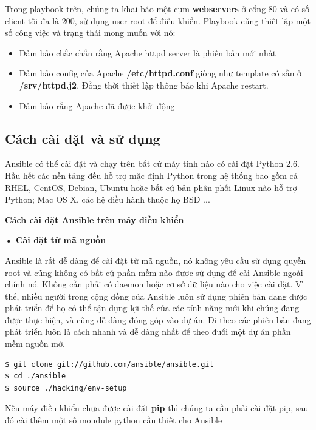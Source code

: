 Trong playbook trên, chúng ta khai báo một cụm \textbf{webservers} ở cổng 80 và có số client tối đa là 200, sử dụng user root để điều khiển. Playbook cũng thiết lập một số công việc và trạng thái mong muốn với nó:

\begin{itemize}
\item Đảm bảo chắc chắn rằng Apache httpd server là phiên bản mới nhất
\item Đảm bảo config của Apache \textbf{/etc/httpd.conf} giống như template có sẵn ở \textbf{/srv/httpd.j2}. Đồng thời thiết lập thông báo khi Apache restart.
\item Đảm bảo rằng Apache đã được khởi động
\end{itemize}

\subsection{Cách cài đặt và sử dụng}

Ansible có thể cài đặt và chạy trên bất cứ máy tính nào có cài đặt Python 2.6. Hầu hết các nền tảng đều hỗ trợ mặc định Python trong hệ thống bao gồm cả RHEL, CentOS, Debian, Ubuntu hoặc bất cứ bản phân phối Linux nào hỗ trợ Python; Mac OS X, các hệ điều hành thuộc họ BSD ...

\textbf{\large Cách cài đặt Ansible trên máy điều khiển}

\textbf{• Cài đặt từ mã nguồn}

Ansible là rất dễ dàng để cài đặt từ mã nguồn, nó không yêu cầu sử dụng quyền root và cũng không có bất cứ phần mềm nào được sử dụng để cài Ansible ngoài chính nó. Không cần phải có daemon hoặc cơ sở dữ liệu nào cho việc cài đặt. Vì thế, nhiều người trong cộng đồng của Ansible luôn sử dụng phiên bản đang được phát triển để họ có thể tận dụng lợi thế của các tính năng mới khi chúng đang được thực hiện, và cũng dễ dàng đóng góp vào dự án. Đi theo các phiên bản đang phát triển luôn là cách nhanh và dễ dàng nhất để theo đuổi một dự án phần mềm nguồn mở.


\begin{lstlisting}[label={lst:ansible_install_from_source},caption={Cài đặt Ansible từ mã nguồn}, language=bash, deletekeywords={env}]
$ git clone git://github.com/ansible/ansible.git
$ cd ./ansible
$ source ./hacking/env-setup
\end{lstlisting}

Nếu máy điều khiển chưa được cài đặt \textbf{pip} thì chúng ta cần phải cài đặt pip, sau đó cài thêm một số moudule python cần thiết cho Ansible

